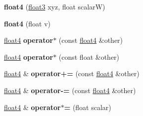 \begin{DoxyCompactItemize}
{\bfseries float4} (\hyperlink{structfloat3}{float3} xyz, float scalarW)
\item 
\mbox{\label{structfloat4_a25dc2c3d9a1346d00a6cd0b3151678de}} 
{\bfseries float4} (float v)
\item 
\mbox{\label{structfloat4_abe286c01f9d43ef28ee4e91a92decac8}} 
\hyperlink{structfloat4}{float4} {\bfseries operator$\ast$} (const \hyperlink{structfloat4}{float4} \&other)
\item 
\mbox{\label{structfloat4_a30e515d290f70a576587b2425afce6d5}} 
\hyperlink{structfloat4}{float4} {\bfseries operator$\ast$} (const float \&other)
\item 
\mbox{\label{structfloat4_a4731852308754d782778c50868140ab6}} 
\hyperlink{structfloat4}{float4} \& {\bfseries operator+=} (const \hyperlink{structfloat4}{float4} \&other)
\item 
\mbox{\label{structfloat4_a6c51914f994cd5c04edb6b47b28fb7f4}} 
\hyperlink{structfloat4}{float4} \& {\bfseries operator-\/=} (const \hyperlink{structfloat4}{float4} \&other)
\item 
\mbox{\label{structfloat4_ae3edbdfcd8ae9e66806e859fac1dc82e}} 
\hyperlink{structfloat4}{float4} \& {\bfseries operator$\ast$=} (float scalar)
\end{DoxyCompactItemize}
